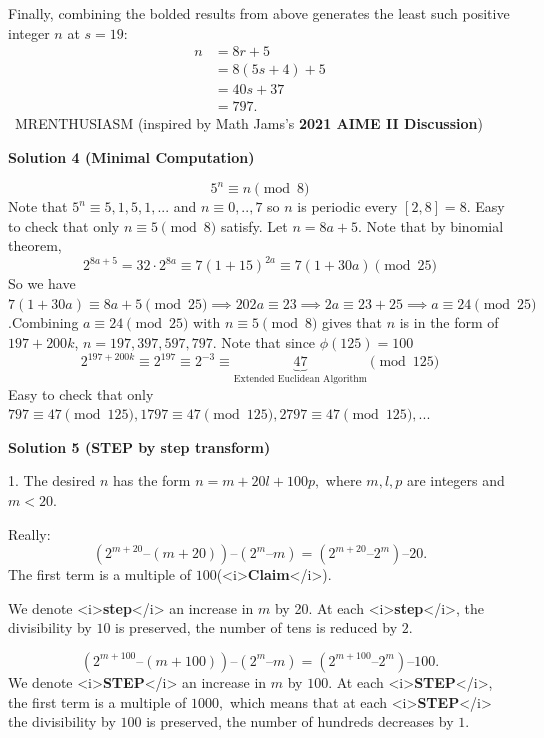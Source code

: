 \begin{enumerate}
\begin{enumerate}
            \end{enumerate}
            Finally, combining the bolded results from above generates the least such positive integer $n$ at $s=19:$
 \begin{align*} n&=8r+5 \\ &=8(5s+4)+5 \\ &=40s+37 \\ &=\boxed{797}. \end{align*}
~MRENTHUSIASM (inspired by Math Jams's \textbf{2021 AIME II Discussion})

 



\textbf{Solution 4 (Minimal Computation)}


 \[5^n \equiv n \pmod{8}\]Note that $5^n \equiv 5,1,5,1,...$ and $n \equiv 0,..,7$ so $n$ is periodic every $[2,8]=8$. Easy to check that only $n\equiv 5 \pmod{8}$ satisfy. Let $n=8a+5$. Note that by binomial theorem, 
 \[2^{8a+5}=32\cdot 2^{8a} \equiv 7(1+15)^{2a} \equiv 7(1+30a)\pmod{25}\]So we have $7(1+30a) \equiv 8a+5\pmod{25} \implies 202a \equiv 23 \implies 2a \equiv 23+25 \implies a \equiv 24 \pmod{25}$.Combining $a\equiv 24\pmod{25}$ with $n \equiv 5 \pmod{8}$ gives that $n$ is in the form of $197+200k$, $n=197,397,597,797$. Note that since $\phi(125)=100$
 \[2^{197+200k} \equiv 2^{197} \equiv 2^{-3} \equiv \underbrace{47}_{\text{Extended Euclidean Algorithm}}\pmod{125}\]Easy to check that only $\boxed{797}\equiv 47\pmod{125},{1797}\equiv 47\pmod{125},{2797}\equiv 47\pmod{125},...$




\textbf{Solution 5 (STEP by step transform)}

1. The desired $n$ has the form  $n = m + 20l + 100p,$ where  $m, l, p$ are integers and $m < 20.$

 Really: 
 \[(2^{m+ 20} – (m + 20)) – (2^m – m) =  (2^{m+ 20} – 2^m) – 20.\] The first term is a multiple of $100$(<i>\textbf{Claim}</i>).

 We denote <i>\textbf{step}</i> an increase in $m$ by 20. At each <i>\textbf{step}</i>, the divisibility by $10$ is preserved, the number of tens is reduced by $2$.

 
 \[(2^{m+ 100} – (m + 100)) – (2^m – m) =  (2^{m+ 100} – 2^m) – 100.\] We denote <i>\textbf{STEP}</i> an increase in $m$ by $100.$ At each <i>\textbf{STEP}</i>, the first term is a multiple of $1000,$ which means that at each <i>\textbf{STEP}</i> the divisibility by $100$ is preserved, the number of hundreds decreases by $1.$


\end{enumerate}
